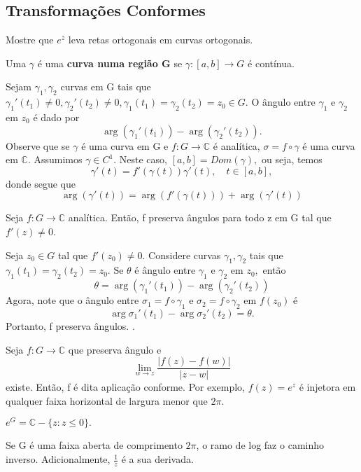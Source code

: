 \documentclass[ComplexAnalysis/complex.tex]{subfiles}
\begin{document}
\subsection{Transformações Conformes}
\begin{exer*}
	Mostre que $e^{z}$ leva retas ortogonais em curvas ortogonais.
\end{exer*}
\begin{def*}
	Uma $\gamma$ é uma \textbf{curva numa região G} se $\gamma:[a, b]\rightarrow G$ é contínua.
\end{def*}
Sejam $\gamma _{1}, \gamma_2$ curvas em G tais que $\gamma_1'(t_1)\neq{0}, \gamma_2'(t_2)\neq{0}, \gamma_1(t_1) = \gamma_2(t_2) = z_{0}\in{G}.$
O ângulo entre $\gamma _{1}\text{ e }\gamma_2$ em $z_{0}$ é dado por
$$
	\arg(\gamma_1'(t_1)) - \arg(\gamma_2'(t_2)).
$$
Observe que se $\gamma$ é uma curva em G e $f:G\rightarrow \mathbb{C}$ é analítica,
$\sigma = f\circ\gamma$ é uma curva em $\mathbb{C}.$ Assumimos $\gamma\in{C^1}.$ Neste
caso, $[a, b] = Dom(\gamma),$ ou seja, temos
$$
	\gamma'(t) = f'(\gamma(t))\gamma'(t), \quad t\in{[a, b]},
$$
donde segue que
$$
	\arg(\gamma'(t)) = \arg(f'(\gamma(t))) + \arg(\gamma'(t))
$$
\begin{theorem*}
	Seja $f:G\rightarrow \mathbb{C}$ analítica. Então, f preserva ângulos para todo
	z em G tal que $f'(z)\neq{0}$.
\end{theorem*}
\begin{proof*}
	Seja $z_{0}\in{G}$ tal que $f'(z_{0})\neq{0}$. Considere curvas $\gamma_1, \gamma_2$
	tais que $\gamma_1(t_1) = \gamma_2(t_2) = z_{0}.$ Se $\theta$ é ângulo entre $\gamma_1\text{ e }\gamma_2\text{ em }z_{0},$
	então
	$$
		\theta = \arg(\gamma_1'(t_1)) - \arg(\gamma_2'(t_2))
	$$
	Agora, note que o ângulo entre $\sigma_1 = f\circ{\gamma_1}$ e $\sigma_2 = f\circ{\gamma_2}$ em
	$f(z_{0})$ é
	$$
		\arg \sigma_1'(t_1) - \arg \sigma_2'(t_2) = \theta.
	$$
	Portanto, f preserva ângulos. \qedsymbol.
\end{proof*}
Seja $f:G\rightarrow \mathbb{C}$ que preserva ângulo e
$$
	\lim_{w\to{z}} \frac{|f(z) - f(w)|}{|z-w|}
$$
existe. Então, f é dita aplicação conforme. Por exemplo, $f(z) = e^z$ é injetora
em qualquer faixa horizontal de largura menor que $2\pi.$
\begin{crl*}
	$e ^{G} = \mathbb{C} - \{z: z\leq{0}\}.$
\end{crl*}
Se G é uma faixa aberta de comprimento $2\pi$, o ramo de log faz o caminho inverso. Adicionalmente,
$\frac{1}{z}$ é a sua derivada.
\end{document}
